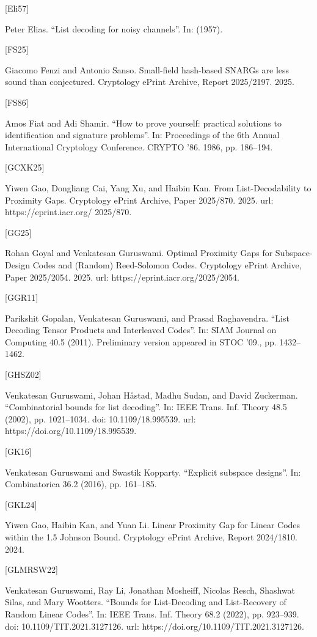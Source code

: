 \documentclass[11pt]{article}
\begin{document}
[Eli57]

Peter Elias. “List decoding for noisy channels”. In: (1957).

[FS25]

Giacomo Fenzi and Antonio Sanso. Small-field hash-based SNARGs are less sound than
conjectured. Cryptology ePrint Archive, Report 2025/2197. 2025.

[FS86]

Amos Fiat and Adi Shamir. “How to prove yourself: practical solutions to identification and
signature problems”. In: Proceedings of the 6th Annual International Cryptology Conference.
CRYPTO ’86. 1986, pp. 186–194.

[GCXK25]

Yiwen Gao, Dongliang Cai, Yang Xu, and Haibin Kan. From List-Decodability to Proximity
Gaps. Cryptology ePrint Archive, Paper 2025/870. 2025. url: https://eprint.iacr.org/
2025/870.

[GG25]

Rohan Goyal and Venkatesan Guruswami. Optimal Proximity Gaps for Subspace-Design
Codes and (Random) Reed-Solomon Codes. Cryptology ePrint Archive, Paper 2025/2054.
2025. url: https://eprint.iacr.org/2025/2054.

[GGR11]

Parikshit Gopalan, Venkatesan Guruswami, and Prasad Raghavendra. “List Decoding Tensor Products and Interleaved Codes”. In: SIAM Journal on Computing 40.5 (2011). Preliminary version appeared in STOC ’09., pp. 1432–1462.

[GHSZ02]

Venkatesan Guruswami, Johan Håstad, Madhu Sudan, and David Zuckerman. “Combinatorial bounds for list decoding”. In: IEEE Trans. Inf. Theory 48.5 (2002), pp. 1021–1034.
doi: 10.1109/18.995539. url: https://doi.org/10.1109/18.995539.

[GK16]

Venkatesan Guruswami and Swastik Kopparty. “Explicit subspace designs”. In: Combinatorica 36.2 (2016), pp. 161–185.

[GKL24]

Yiwen Gao, Haibin Kan, and Yuan Li. Linear Proximity Gap for Linear Codes within the
1.5 Johnson Bound. Cryptology ePrint Archive, Report 2024/1810. 2024.

[GLMRSW22]

Venkatesan Guruswami, Ray Li, Jonathan Mosheiff, Nicolas Resch, Shashwat Silas, and
Mary Wootters. “Bounds for List-Decoding and List-Recovery of Random Linear Codes”.
In: IEEE Trans. Inf. Theory 68.2 (2022), pp. 923–939. doi: 10.1109/TIT.2021.3127126.
url: https://doi.org/10.1109/TIT.2021.3127126.
\end{document}
